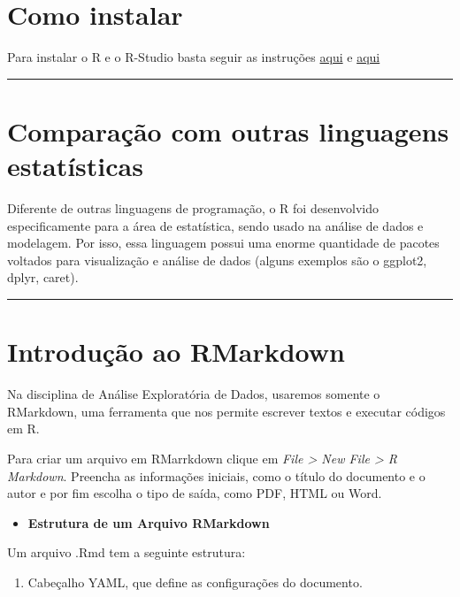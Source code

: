 \documentclass[
]{book}
\providecommand{\tightlist}{%
  \setlength{\itemsep}{0pt}\setlength{\parskip}{0pt}}
\begin{document}
\section{Como instalar}\label{como-instalar}

Para instalar o R e o R-Studio basta seguir as instruções \href{https://livro.curso-r.com/1-1-instalacao-do-r.html}{aqui} e \href{https://livro.curso-r.com/1-2-instalacao-do-rstudio.html}{aqui}

\begin{center}\rule{0.5\linewidth}{0.5pt}\end{center}

\section{Comparação com outras linguagens estatísticas}\label{comparauxe7uxe3o-com-outras-linguagens-estatuxedsticas}

Diferente de outras linguagens de programação, o R foi desenvolvido especificamente para a área de estatística, sendo usado na análise de dados e modelagem. Por isso, essa linguagem possui uma enorme quantidade de pacotes voltados para visualização e análise de dados (alguns exemplos são o ggplot2, dplyr, caret).

\begin{center}\rule{0.5\linewidth}{0.5pt}\end{center}

\section{Introdução ao RMarkdown}\label{introduuxe7uxe3o-ao-rmarkdown}

Na disciplina de Análise Exploratória de Dados, usaremos somente o RMarkdown, uma ferramenta que nos permite escrever textos e executar códigos em R.

Para criar um arquivo em RMarrkdown clique em \emph{File \textgreater{} New File \textgreater{} R Markdown}. Preencha as informações iniciais, como o título do documento e o autor e por fim escolha o tipo de saída, como PDF, HTML ou Word.

\begin{itemize}
\tightlist
\item
  \textbf{Estrutura de um Arquivo RMarkdown}
\end{itemize}

Um arquivo .Rmd tem a seguinte estrutura:

\begin{enumerate}
\def\labelenumi{\arabic{enumi}.}
\tightlist
\item
  Cabeçalho YAML, que define as configurações do documento.
\end{enumerate}
\end{document}
